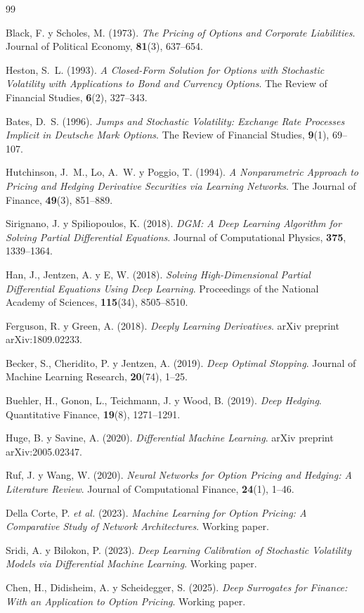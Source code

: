\documentclass[11pt,a4paper]{article}
\begin{document}
\begin{thebibliography}{99}

Black, F. y Scholes, M. (1973).
\textit{The Pricing of Options and Corporate Liabilities}.
Journal of Political Economy, \textbf{81}(3), 637--654.

Heston, S.~L. (1993).
\textit{A Closed-Form Solution for Options with Stochastic Volatility with Applications to Bond and Currency Options}.
The Review of Financial Studies, \textbf{6}(2), 327--343.

Bates, D.~S. (1996).
\textit{Jumps and Stochastic Volatility: Exchange Rate Processes Implicit in Deutsche Mark Options}.
The Review of Financial Studies, \textbf{9}(1), 69--107.

Hutchinson, J.~M., Lo, A.~W. y Poggio, T. (1994).
\textit{A Nonparametric Approach to Pricing and Hedging Derivative Securities via Learning Networks}.
The Journal of Finance, \textbf{49}(3), 851--889.

Sirignano, J. y Spiliopoulos, K. (2018).
\textit{DGM: A Deep Learning Algorithm for Solving Partial Differential Equations}.
Journal of Computational Physics, \textbf{375}, 1339--1364.

Han, J., Jentzen, A. y E, W. (2018).
\textit{Solving High-Dimensional Partial Differential Equations Using Deep Learning}.
Proceedings of the National Academy of Sciences, \textbf{115}(34), 8505--8510.

Ferguson, R. y Green, A. (2018).
\textit{Deeply Learning Derivatives}.
arXiv preprint arXiv:1809.02233.

Becker, S., Cheridito, P. y Jentzen, A. (2019).
\textit{Deep Optimal Stopping}.
Journal of Machine Learning Research, \textbf{20}(74), 1--25.

Buehler, H., Gonon, L., Teichmann, J. y Wood, B. (2019).
\textit{Deep Hedging}.
Quantitative Finance, \textbf{19}(8), 1271--1291.

Huge, B. y Savine, A. (2020).
\textit{Differential Machine Learning}.
arXiv preprint arXiv:2005.02347.

Ruf, J. y Wang, W. (2020).
\textit{Neural Networks for Option Pricing and Hedging: A Literature Review}.
Journal of Computational Finance, \textbf{24}(1), 1--46.

Della Corte, P. \emph{et al.} (2023).
\textit{Machine Learning for Option Pricing: A Comparative Study of Network Architectures}.
Working paper.

Sridi, A. y Bilokon, P. (2023).
\textit{Deep Learning Calibration of Stochastic Volatility Models via Differential Machine Learning}.
Working paper.

Chen, H., Didisheim, A. y Scheidegger, S. (2025).
\textit{Deep Surrogates for Finance: With an Application to Option Pricing}.
Working paper.

\end{thebibliography}
\end{document}
